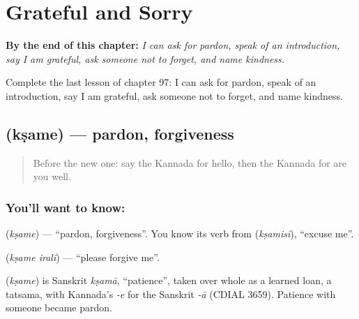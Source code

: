 
\chapter{Grateful and Sorry}
\label{ch:ka-grateful-and-sorry}

\begin{chapteropening}
\textbf{By the end of this chapter:} \emph{I can ask for pardon, speak of an introduction, say I am grateful, ask someone not to forget, and name kindness.}

Complete the last lesson of chapter 97: I can ask for pardon, speak of an introduction, say I am grateful, ask someone not to forget, and name kindness.
\end{chapteropening}

\section[\texorpdfstring{\kn{ಕ್ಷಮೆ} (kṣame)}{ಕ್ಷಮೆ (kṣame)}]{ (kṣame) — pardon, forgiveness}

\label{lesson:KA-C97-pardon}



\begin{quote}
Before the new one: say the Kannada for hello, then the Kannada for are you well.
\end{quote}

\subsection*{You'll want to know: }
\textbf{} (\emph{kṣame}) — \textquotedblleft{}pardon, forgiveness\textquotedblright{}. You know its verb from \textbf{} (\emph{kṣamisi}), \textquotedblleft{}excuse me\textquotedblright{}.

\textbf{ } (\emph{kṣame irali}) — \textquotedblleft{}please forgive me\textquotedblright{}.

\begin{cousinweb}
\textbf{} (\emph{kṣame}) is Sanskrit \emph{kṣamā}, \textquotedblleft{}patience\textquotedblright{}, taken over whole as a learned loan, a tatsama, with Kannada's \emph{-e} for the Sanskrit \emph{-ā} (CDIAL 3659). Patience with someone became pardon.
\end{cousinweb}

